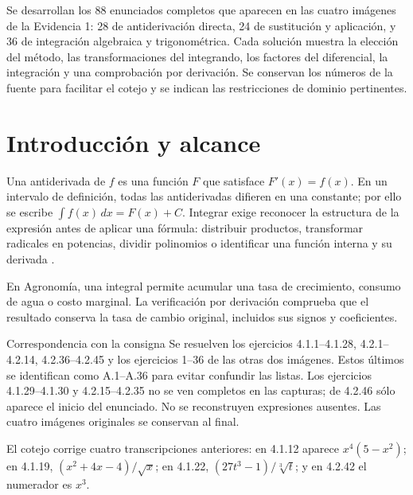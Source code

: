 \begin{abstractd}
Se desarrollan los 88 enunciados completos que aparecen en las cuatro imágenes de la Evidencia 1: 28 de antiderivación directa, 24 de sustitución y aplicación, y 36 de integración algebraica y trigonométrica. Cada solución muestra la elección del método, las transformaciones del integrando, los factores del diferencial, la integración y una comprobación por derivación. Se conservan los números de la fuente para facilitar el cotejo y se indican las restricciones de dominio pertinentes.
\end{abstractd}
\templateIndex
\clearpage
{}

\section{Introducción y alcance}
Una antiderivada de $f$ es una función $F$ que satisface $F'(x)=f(x)$. En un intervalo de definición, todas las antiderivadas difieren en una constante; por ello se escribe $\int f(x)\,dx=F(x)+C$. Integrar exige reconocer la estructura de la expresión antes de aplicar una fórmula: distribuir productos, transformar radicales en potencias, dividir polinomios o identificar una función interna y su derivada \citep{stewart2016calculus,openstax2016calculus1}.

En Agronomía, una integral permite acumular una tasa de crecimiento, consumo de agua o costo marginal. La verificación por derivación comprueba que el resultado conserva la tasa de cambio original, incluidos sus signos y coeficientes.

\begin{sourcebox}{Correspondencia con la consigna}
Se resuelven los ejercicios 4.1.1--4.1.28, 4.2.1--4.2.14, 4.2.36--4.2.45 y los ejercicios 1--36 de las otras dos imágenes. Estos últimos se identifican como A.1--A.36 para evitar confundir las listas. Los ejercicios 4.1.29--4.1.30 y 4.2.15--4.2.35 no se ven completos en las capturas; de 4.2.46 sólo aparece el inicio del enunciado. No se reconstruyen expresiones ausentes. Las cuatro imágenes originales se conservan al final.

El cotejo corrige cuatro transcripciones anteriores: en 4.1.12 aparece $x^4(5-x^2)$; en 4.1.19, $(x^2+4x-4)/\sqrt{x}$; en 4.1.22, $(27t^3-1)/\sqrt[3]{t}$; y en 4.2.42 el numerador es $x^3$.
\end{sourcebox}

